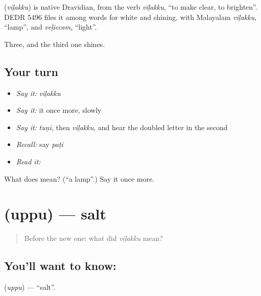 \begin{cousinweb}
\textbf{} (\emph{viḷakku}) is native Dravidian, from the verb \emph{viḷakku}, \textquotedblleft{}to make clear, to brighten\textquotedblright{}. DEDR 5496 files it among words for white and shining, with Malayalam \emph{viḷakku}, \textquotedblleft{}lamp\textquotedblright{}, and \emph{veḷiccam}, \textquotedblleft{}light\textquotedblright{}.
\end{cousinweb}

\begin{grammarlens}[title={What you've built}]
Three, and the third one shines.
\end{grammarlens}

\subsection*{Your turn}
\begin{itemize}
\raggedright
  \item \emph{Say it:} \emph{viḷakku}
  \item \emph{Say it:} it once more, slowly
  \item \emph{Say it:} \emph{tuṇi}, then \emph{viḷakku}, and hear the doubled letter in the second
  \item \emph{Recall:} say \emph{paṭi}
  \item \emph{Read it:} \textbf{}
\end{itemize}

\begin{tcolorbox}[breakable,colback=teal!4,colframe=teal!35!black,title={Before you move on}]
What does  mean? (\textquotedblleft{}a lamp\textquotedblright{}.) Say it once more.
\end{tcolorbox}
\section[\texorpdfstring{\ta{உப்பு} (uppu)}{உப்பு (uppu)}]{ (uppu) — salt}

\label{lesson:TA-C44-salt}



\begin{quote}
Before the new one: what did \emph{viḷakku} mean?
\end{quote}

\subsection*{You'll want to know: }
\textbf{} (\emph{uppu}) — \textquotedblleft{}salt\textquotedblright{}.

